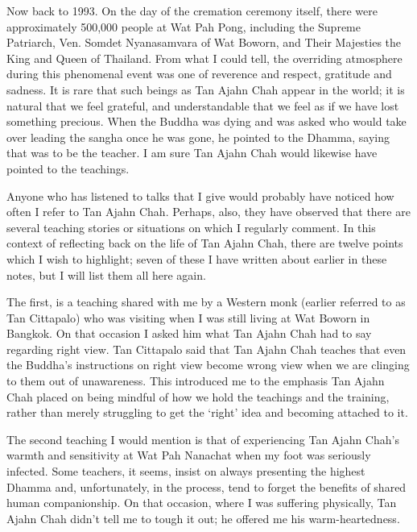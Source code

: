 Now back to 1993. On the day of the cremation ceremony itself, there
were approximately 500,000 people\cite{cremation}
at Wat Pah Pong, including the Supreme Patriarch, Ven.
Somdet Nyanasamvara of Wat Boworn, and Their Majesties the King and
Queen of Thailand. From what I could tell, the \mbox{overriding} atmosphere
during this phenomenal event was one of reverence and respect, gratitude
and sadness. It is rare that such beings as Tan Ajahn Chah appear in the
world; it is natural that we feel grateful, and understandable that we
feel as if we have lost something precious. When the Buddha was dying
and was asked who would take over leading the sangha once he was gone,
he pointed to the Dhamma, saying that was to be the teacher. I am sure
Tan Ajahn Chah would likewise have pointed to the teachings.

Anyone who has listened to talks that I give\cite{talks}
would probably have noticed how often I refer to
Tan Ajahn Chah. Perhaps, also, they have observed that there are several
teaching stories or situations on which I regularly comment. In this context of reflecting back on the life of Tan Ajahn Chah, there are twelve points which I wish to highlight; seven of these I have written about earlier in these notes, but I will list them all here again.

The first, is a teaching shared with me by a Western monk (earlier referred to
as Tan Cittapalo) who was visiting when I was still living at Wat Boworn in
Bangkok.
On that occasion I asked him what
Tan Ajahn Chah had to say regarding right view. Tan Cittapalo said that
Tan Ajahn Chah teaches that even the Buddha's instructions on right view
become wrong view when we are clinging to them out of unawareness. This
introduced me to the emphasis Tan Ajahn Chah placed on being mindful of
how we hold the teachings and the training, rather than merely
struggling to get the `right' idea and becoming attached to it.

The second teaching I would mention is that of experiencing Tan Ajahn
Chah's warmth and sensitivity at Wat Pah Nanachat when my foot was
seriously infected. Some teachers, it seems, insist on always presenting
the highest Dhamma and, unfortunately, in the process, tend to forget
the benefits of shared human companionship. On that occasion, where I
was suffering physically, Tan Ajahn Chah didn't tell me to tough it out;
he offered me his warm-heartedness.

